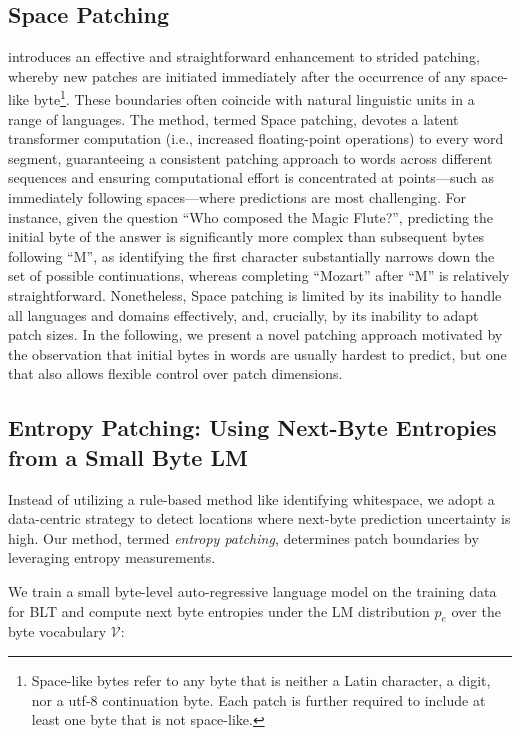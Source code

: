 \subsection{Space Patching}
\label{section:white-patch}

\citet{slagle2024spacebyte} introduces an effective and straightforward enhancement to strided patching, whereby new patches are initiated immediately after the occurrence of any space-like byte\footnote{
    Space-like bytes refer to any byte that is neither a Latin character, a digit, nor a utf-8 continuation byte. Each patch is further required to include at least one byte that is not space-like. }. These boundaries often coincide with natural linguistic units in a range of languages. The method, termed Space patching, devotes a latent transformer computation (i.e., increased floating-point operations) to every word segment, guaranteeing a consistent patching approach to words across different sequences and ensuring computational effort is concentrated at points—such as immediately following spaces—where predictions are most challenging. For instance, given the question ``Who composed the Magic Flute?\uline{\hspace{.6em}}'', predicting the initial byte of the answer is significantly more complex than subsequent bytes following ``M'', as identifying the first character substantially narrows down the set of possible continuations, whereas completing ``Mozart'' after ``M'' is relatively straightforward. Nonetheless, Space patching is limited by its inability to handle all languages and domains effectively, and, crucially, by its inability to adapt patch sizes. In the following, we present a novel patching approach motivated by the observation that initial bytes in words are usually hardest to predict, but one that also allows flexible control over patch dimensions.

\subsection{Entropy Patching: Using Next-Byte Entropies from a Small Byte LM}
\label{section:dyn-patch}

Instead of utilizing a rule-based method like identifying whitespace, we adopt a data-centric strategy to detect locations where next-byte prediction uncertainty is high. Our method, termed \textit{entropy patching}, determines patch boundaries by leveraging entropy measurements.

We train a small byte-level auto-regressive language model on the training data for {\textsc BLT} and compute next byte entropies under the LM distribution $p_{e}$ over the byte vocabulary $\mathcal{V}$:


